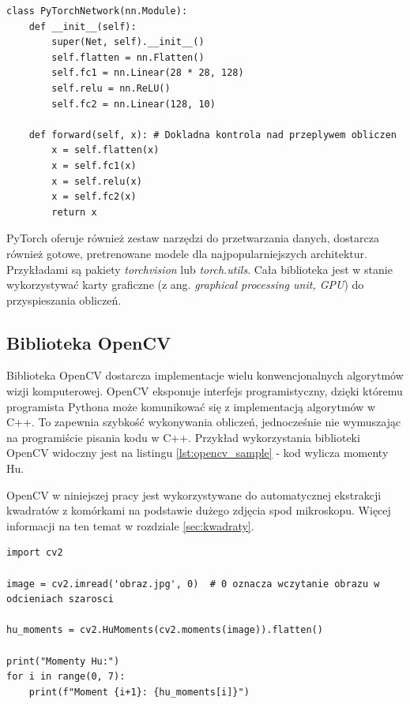 \begin{lstlisting}[language=ipython,caption={Przykładowa sieć neuronowa w PyTorch},label={lst:pytorch_sample}]
class PyTorchNetwork(nn.Module):
    def __init__(self):
        super(Net, self).__init__()
        self.flatten = nn.Flatten()
        self.fc1 = nn.Linear(28 * 28, 128)
        self.relu = nn.ReLU()
        self.fc2 = nn.Linear(128, 10)

    def forward(self, x): # Dokladna kontrola nad przeplywem obliczen
        x = self.flatten(x)
        x = self.fc1(x)
        x = self.relu(x)
        x = self.fc2(x)
        return x
\end{lstlisting}

PyTorch oferuje również zestaw narzędzi do przetwarzania danych, dostarcza również gotowe, pretrenowane modele dla najpopularniejszych architektur.
Przykładami są pakiety \textit{torchvision} lub \textit{torch.utils}. Cała biblioteka jest w stanie wykorzystywać karty graficzne (z ang. \textit{graphical processing unit, GPU}) do przyspieszania obliczeń.

\subsection{Biblioteka OpenCV}

Biblioteka OpenCV \cite{opencv} dostarcza implementacje wielu konwencjonalnych algorytmów wizji komputerowej.
OpenCV eksponuje interfejs programistyczny, dzięki któremu programista Pythona może komunikować się z implementacją algorytmów w C++.
To zapewnia szybkość wykonywania obliczeń, jednocześnie nie wymuszając na programiście pisania kodu w C++. Przykład wykorzystania biblioteki OpenCV widoczny jest na listingu \ref{lst:opencv_sample}
- kod wylicza momenty Hu.

OpenCV w niniejszej pracy jest wykorzystywane do automatycznej ekstrakcji kwadratów z komórkami na podstawie dużego zdjęcia spod mikroskopu.
Więcej informacji na ten temat w rozdziale \ref{sec:kwadraty}.

\begin{lstlisting}[language=ipython,caption={Obliczenie momentów Hu z użyciem OpenCV}, label={lst:opencv_sample}]
import cv2

image = cv2.imread('obraz.jpg', 0)  # 0 oznacza wczytanie obrazu w odcieniach szarosci

hu_moments = cv2.HuMoments(cv2.moments(image)).flatten()

print("Momenty Hu:")
for i in range(0, 7):
    print(f"Moment {i+1}: {hu_moments[i]}")
\end{lstlisting}

